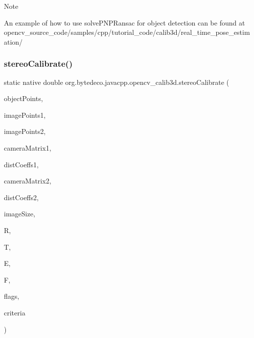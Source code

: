 \begin{DoxyNote}{Note}

\begin{DoxyItemize}
\item An example of how to use solve\+P\+N\+P\+Ransac for object detection can be found at opencv\+\_\+source\+\_\+code/samples/cpp/tutorial\+\_\+code/calib3d/real\+\_\+time\+\_\+pose\+\_\+estimation/ 
\end{DoxyItemize}
\end{DoxyNote}
\mbox{\label{group__calib3d_gab585e0688b9d7592dfe294c5179bdcae}} 
\subsubsection{\texorpdfstring{stereo\+Calibrate()}{stereoCalibrate()}}
{\footnotesize\ttfamily static native double org.\+bytedeco.\+javacpp.\+opencv\+\_\+calib3d.\+stereo\+Calibrate (\begin{DoxyParamCaption}\item[{@By\+Val Mat\+Vector}]{object\+Points,  }\item[{@By\+Val Mat\+Vector}]{image\+Points1,  }\item[{@By\+Val Mat\+Vector}]{image\+Points2,  }\item[{@By\+Val Mat}]{camera\+Matrix1,  }\item[{@By\+Val Mat}]{dist\+Coeffs1,  }\item[{@By\+Val Mat}]{camera\+Matrix2,  }\item[{@By\+Val Mat}]{dist\+Coeffs2,  }\item[{@By\+Val Size}]{image\+Size,  }\item[{@By\+Val Mat}]{R,  }\item[{@By\+Val Mat}]{T,  }\item[{@By\+Val Mat}]{E,  }\item[{@By\+Val Mat}]{F,  }\item[{int}]{flags,  }\item[{@By\+Val(null\+Value=\char`\"{}cv\+::\+Term\+Criteria(cv\+::\+Term\+Criteria\+::\+C\+O\+U\+NT+cv\+::\+Term\+Criteria\+::\+E\+PS, 30, 1e-\/6)\char`\"{}) Term\+Criteria}]{criteria }\end{DoxyParamCaption})\hspace{0.3cm}{\ttfamily [static]}}



